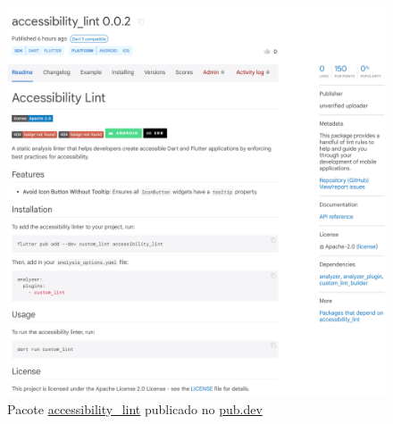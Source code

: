 \begin{figure}[!ht]
	\centering
	\caption{Pacote \href{https://pub.dev/packages/accessibility_lint}{accessibility\_lint} publicado no \href{https://pub.dev}{pub.dev}}\label{fig:pacote-publicado-pub-dev}
	\includegraphics[width=400pt]{Assets/PacotePublicadoPubDev.png}
\end{figure}
